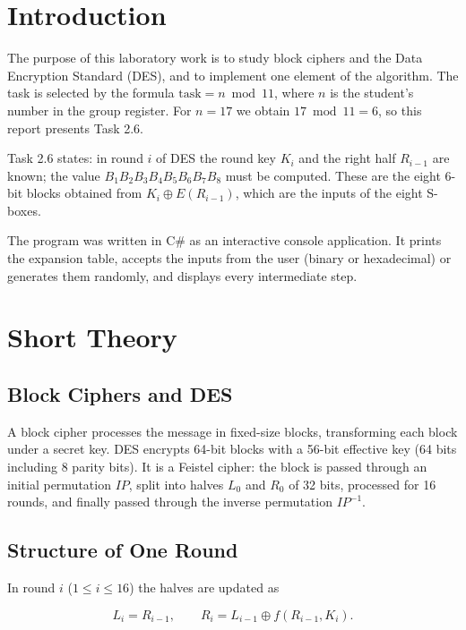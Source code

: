 \documentclass[12pt,a4paper]{article}
\begin{document}
\setcounter{page}{2}
\tableofcontents
\newpage

\section*{Introduction}

The purpose of this laboratory work is to study block ciphers and the Data Encryption Standard (DES), and to implement one element of the algorithm. The task is selected by the formula $\mathrm{task} = n \bmod 11$, where $n$ is the student's number in the group register. For $n = 17$ we obtain $17 \bmod 11 = 6$, so this report presents Task 2.6.

Task 2.6 states: in round $i$ of DES the round key $K_i$ and the right half $R_{i-1}$ are known; the value $B_1B_2B_3B_4B_5B_6B_7B_8$ must be computed. These are the eight 6-bit blocks obtained from $K_i \oplus E(R_{i-1})$, which are the inputs of the eight S-boxes.

The program was written in C\# as an interactive console application. It prints the expansion table, accepts the inputs from the user (binary or hexadecimal) or generates them randomly, and displays every intermediate step.

\newpage
\section{Short Theory}

\subsection{Block Ciphers and DES}

A block cipher processes the message in fixed-size blocks, transforming each block under a secret key. DES encrypts 64-bit blocks with a 56-bit effective key (64 bits including 8 parity bits). It is a Feistel cipher: the block is passed through an initial permutation $IP$, split into halves $L_0$ and $R_0$ of 32 bits, processed for 16 rounds, and finally passed through the inverse permutation $IP^{-1}$.

\subsection{Structure of One Round}

In round $i$ ($1\le i\le 16$) the halves are updated as

\begin{equation}
  L_i = R_{i-1}, \qquad R_i = L_{i-1} \oplus f(R_{i-1}, K_i).
\end{equation}
\end{document}
